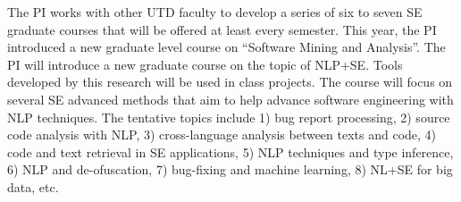 The PI works
with other UTD faculty to develop a series of six to seven SE graduate
courses that will be offered at least every semester. This year, the
PI introduced a new graduate level course on ``Software Mining and
Analysis''. The PI will introduce a new graduate course on the topic
of NLP+SE. Tools developed by this research will be used in class
projects. The course will focus on several SE advanced methods that
aim to help advance software engineering with NLP techniques. The
tentative topics include 1) bug report processing, 2) source code
analysis with NLP, 3) cross-language analysis between texts and code,
4) code and text retrieval in SE applications, 5) NLP techniques and
type inference, 6) NLP and de-ofuscation, 7) bug-fixing and
machine learning, 8) NL+SE for big data, etc.





%
